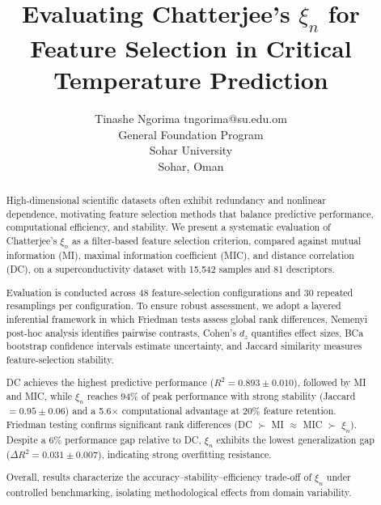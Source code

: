 \documentclass[twoside,11pt]{article}
\begin{document}
\title{Evaluating Chatterjee’s \(\xi_n\)
for Feature Selection in Critical Temperature Prediction  }

\author{\name Tinashe Ngorima \email tngorima@su.edu.om \\
       \addr General Foundation Program\\
       Sohar University\\
       Sohar, Oman}

\editor{}

\maketitle

\begin{abstract}%

\end{abstract}
\begin{abstract}%
High-dimensional scientific datasets often exhibit redundancy and nonlinear dependence, motivating feature selection methods that balance predictive performance, computational efficiency, and stability. We present a systematic evaluation of Chatterjee’s $\xi_n$ as a filter-based feature selection criterion, compared against mutual information (MI), maximal information coefficient (MIC), and distance correlation (DC), on a superconductivity dataset with 15,542 samples and 81 descriptors.

Evaluation is conducted across 48 feature-selection configurations and 30 repeated resamplings per configuration. To ensure robust assessment, we adopt a layered inferential framework in which Friedman tests assess global rank differences, Nemenyi post-hoc analysis identifies pairwise contrasts, Cohen's $d_z$ quantifies effect sizes, BCa bootstrap confidence intervals estimate uncertainty, and Jaccard similarity measures feature-selection stability.

DC achieves the highest predictive performance ($R^2 = 0.893 \pm 0.010$), followed by MI and MIC, while $\xi_n$ reaches 94\% of peak performance with strong stability (Jaccard $= 0.95 \pm 0.06$) and a 5.6$\times$ computational advantage at 20\% feature retention. Friedman testing confirms significant rank differences (DC $\succ$ MI $\approx$ MIC $\succ$ $\xi_n$). Despite a 6\% performance gap relative to DC, $\xi_n$ exhibits the lowest generalization gap ($\Delta R^2 = 0.031 \pm 0.007$), indicating strong overfitting resistance.

Overall, results characterize the accuracy--stability--efficiency trade-off of $\xi_n$ under controlled benchmarking, isolating methodological effects from domain variability.
\end{abstract}
\end{document}

